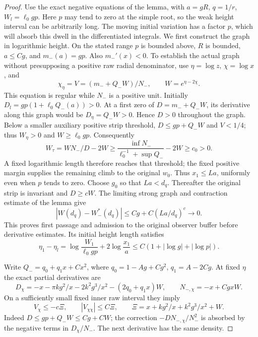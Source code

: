 \begin{proof}
Use the exact negative equations of the lemma, with
\(a=gR\), \(q=1/r\), \(W_l=\ell_0gp\).
Here \(p\) may tend to zero at the simple root, so the weak height
interval can be arbitrarily long. The moving initial variation has
a factor \(p\), which will absorb this dwell in the differentiated
integrals. We first construct the graph in logarithmic height.
On the stated range \(p\) is bounded above, \(R\) is bounded,
\(a\le Cg\), and \(m_-(a)=gp\). Also \(m_-'(x)<0\).
To establish the actual graph without presupposing a positive raw
radial denominator, use \(\eta=\log z\), \(\chi=\log x\), and
\[
 \chi_\eta=V=(m_-+Q_-W)/N_-,\qquad W=e^{\eta-2\chi}.
\]
This equation is regular while \(N_-\) is a positive unit.
Initially \(D_l=gp(1+\ell_0Q_-(a))>0\).
At a first zero of \(D=m_-+Q_-W\), its derivative along this graph
would be \(D_\eta=Q_-W>0\). Hence \(D>0\) throughout the graph.
Below a smaller auxiliary positive strip threshold,
\(D\le gp+Q_-W\) and \(V<1/4\); thus \(W_\eta>0\) and
\(W\ge\ell_0gp\). Consequently
\[
 W_\tau=WN_-/D-2W
 \ge\frac{\inf N_-}{\ell_0^{-1}+\sup Q_-}-2W\ge c_0>0.
\]
A fixed logarithmic length therefore reaches that threshold; the fixed
positive margin supplies the remaining climb to the original \(w_0\).
Thus \(x_1\le La\), uniformly even when \(p\) tends to zero.
Choose \(g_0\) so that \(La<d_q\). Thereafter the original strip is
invariant and \(D\ge cW\). The limiting strong graph and contraction
estimate of the lemma give
\[
 |W(d_q)-W_-^*(d_q)|\le Cg+C(La/d_q)^c\longrightarrow0.
\]
This proves first passage and admission to the original observer buffer
before derivative estimates. Its initial height length satisfies
\[
 \eta_1-\eta_l
 =\log\frac{W_1}{\ell_0gp}+2\log\frac{x_1}{a}
 \le C(1+|\log g|+|\log p|).
\]

Write \(Q_-=q_0+q_1x+Cx^2\), where
\(q_0=1-Ag+Cg^2\), \(q_1=A-2Cg\).
At fixed \(\eta\) the exact partial derivatives are
\[
 D_\chi=-x-\pi kg^2/x-2k^2g^3/x^2-(2q_0+q_1x)W,
 \qquad N_{-,\chi}=-x+CgxW.
\]
On a sufficiently small fixed inner raw interval they imply
\begin{equation}\label{deg:negative-inverse-dissipation}
 V_\chi\le-c\Xi,\qquad |V_{\chi\chi}|\le C\Xi,
 \qquad \Xi=x+kg^2/x+k^2g^3/x^2+W.
\end{equation}
Indeed \(D\le gp+Q_-W\le Cg+CW\); the correction
\(-DN_{-,\chi}/N_-^2\) is absorbed by the negative terms in
\(D_\chi/N_-\). The next derivative has the same density.


\end{proof}
